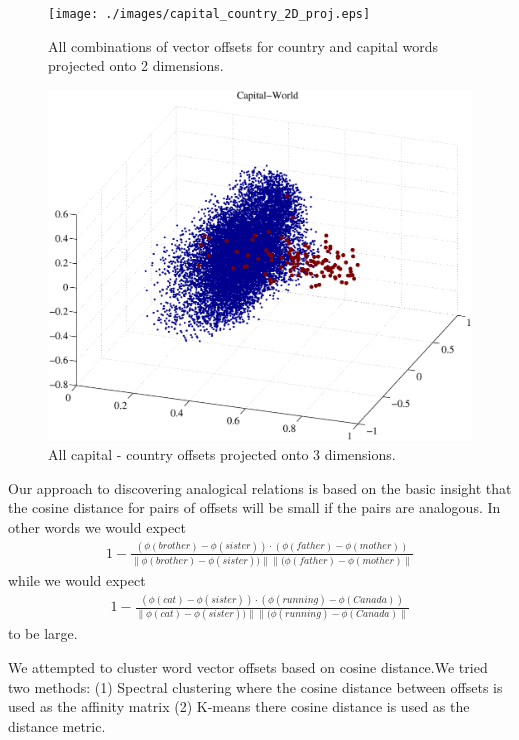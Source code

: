 \begin{figure}[h]
\centering
\texttt{[image: ./images/capital\_country\_2D\_proj.eps]}
\caption{All combinations of vector offsets for country and capital words projected onto 2 dimensions.}
\label{fig:2D_offsets}
\end{figure}

\begin{figure}[h]
\centering
\includegraphics[width=\textwidth]{./images/capital_world.eps}
\caption{All capital - country offsets projected onto 3 dimensions. }
\label{fig:3D_offsets}
\end{figure}

Our approach to discovering analogical relations is based on the basic insight that the cosine distance for pairs of offsets will be small if the pairs are analogous. In other words we would expect 
\begin{align*}1 - \frac{(\phi(brother) - \phi(sister)) \cdot (\phi(father) - \phi(mother))}{ \| \phi(brother) - \phi(sister)) \| \| (\phi(father) - \phi(mother)\|}\end{align*}
while we would expect 
 \begin{align*}1 - \frac{(\phi(cat) - \phi(sister)) \cdot (\phi(running) - \phi(Canada))}{ \| \phi(cat) - \phi(sister)) \| \| (\phi(running) - \phi(Canada)\|}\end{align*} 
 to be large. 

We attempted to cluster word vector offsets based on cosine distance.We tried two methods: (1) Spectral clustering where the cosine distance between offsets is used as the affinity matrix (2) K-means there cosine distance is used as the distance metric. 

